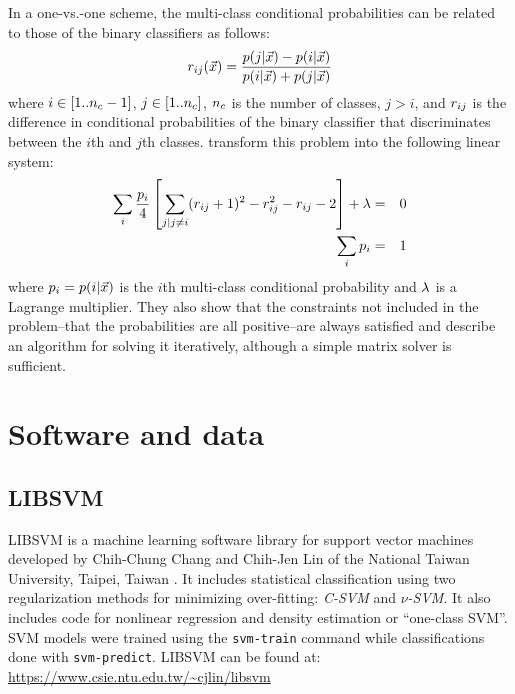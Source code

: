 In a one-vs.-one scheme, the multi-class conditional probabilities 
can be related to those of the binary classifiers as follows:
\begin{equation}
	r_{ij}(\vec {x}) = \frac{p(j|\vec {x}) - p(i|\vec {x})}{p(i|\vec {x}) + p(j|\vec {x})}
\end{equation}
where $i \in [1..n_c-1]$, $j \in [1..n_c]$, $n_c$ is the number of classes, $j>i$,
and $r_{ij}$ is the difference in conditional probabilities of
the binary classifier that discriminates between the $i$th and $j$th classes.
\citet{Wu_etal2004} transform this problem into the following linear system:
\begin{eqnarray}
	\sum_i \frac{p_i}{4} \left [ \sum_{j|j \ne i} (r_{ij} + 1)^2 - r_{ij}^2 - r_{ij} - 2 \right ] + \lambda & = & 0 \\
	\label{multiclass}
	\sum_i p_i & = & 1
\end{eqnarray}
where $p_i = p(i | \vec {x})$ is the $i$th multi-class 
conditional probability and $\lambda$ is a Lagrange multiplier.
They also show that the constraints not included in the problem--that
the probabilities are all positive--are always satisfied
and describe an algorithm for solving it iteratively, although a
simple matrix solver is sufficient.

\section{Software and data}

\label{methods}

\subsection{LIBSVM}

LIBSVM is a machine learning software library for support vector machines 
developed by Chih-Chung Chang and Chih-Jen Lin of 
the National Taiwan University, Taipei, Taiwan \citep{Chang_Lin2011}.
It includes statistical classification using two regularization methods 
for minimizing over-fitting: 
{\it C-SVM} and {\it $\nu$-SVM}.
It also includes code for nonlinear regression and density estimation or
``one-class SVM''.
SVM models were trained using the \verb/svm-train/ command while
classifications done with \verb/svm-predict/.
LIBSVM can be found at: \url{https://www.csie.ntu.edu.tw/~cjlin/libsvm}

